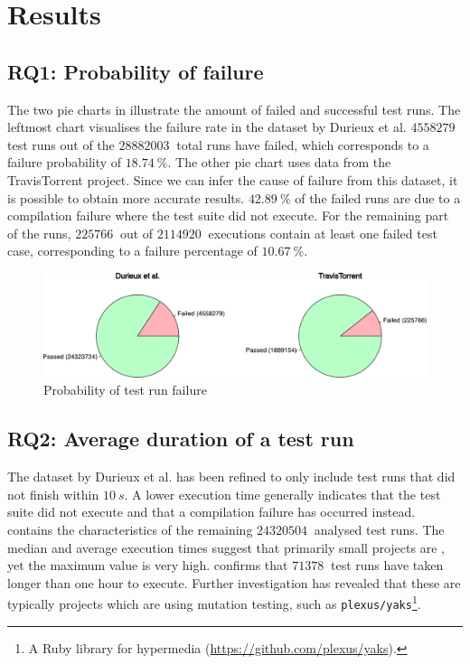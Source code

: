 
\section{Results}

\subsection{RQ1: Probability of failure}\label{ssec:results-rq1}
The two pie charts in  illustrate the amount of failed and successful test runs. The leftmost chart visualises the failure rate in the dataset \cite{travisanalysis} by Durieux et al. $\SI{4558279}{}$ test runs out of the $\SI{28882003}{}$ total runs have failed, which corresponds to a failure probability of $\SI{18.74}{\percent}$. The other pie chart uses data from the TravisTorrent \cite{msr17challenge} project. Since we can infer the cause of failure from this dataset, it is possible to obtain more accurate results. $\SI{42.89}{\percent}$ of the failed runs are due to a compilation failure where the test suite did not execute. For the remaining part of the runs, $\SI{225766}{}$ out of $\SI{2114920}{}$ executions contain at least one failed test case, corresponding to a failure percentage of $\SI{10.67}{\percent}$.

\begin{figure}[htbp!]
	\centering
	\includegraphics[width=\textwidth]{assets/charts/rq1-failure-probability.pdf}
	\caption{Probability of test run failure}
	\label{fig:rq1-failure-probability}
\end{figure}

\subsection{RQ2: Average duration of a test run}
The dataset by Durieux et al. \cite{travisanalysis} has been refined to only include test runs that did not finish within $\SI{10}{s}$. A lower execution time generally indicates that the test suite did not execute and that a compilation failure has occurred instead.  contains the characteristics of the remaining $\SI{24320504}{}$ analysed test runs. The median and average execution times suggest that primarily small projects are \travisci{}, yet the maximum value is very high.  confirms that $\SI{71378}{}$ test runs have taken longer than one hour to execute. Further investigation has revealed that these are typically projects which are using mutation testing, such as \texttt{plexus/yaks}\footnote{A Ruby library for hypermedia (\url{https://github.com/plexus/yaks}).}.

